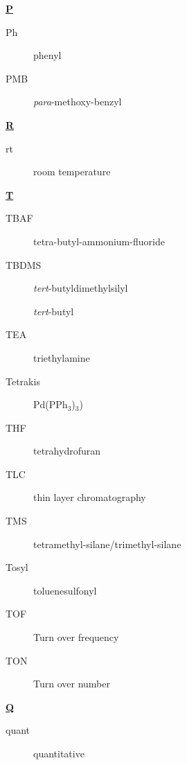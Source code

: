 \begin{multicols}{2}
{\begin{center}
\textbf{\underline{P}}
\end{center}
\begin{description}
\item[Ph]   phenyl 
\item[PMB]  \textit{para}-methoxy-benzyl
\end{description}

\begin{center}
\textbf{\underline{R}}
\end{center}
\begin{description}
\item[rt]   room temperature 
\end{description}

\begin{center}
\textbf{\underline{T}}
\end{center}
\begin{description}
\item[TBAF]	 tetra-butyl-ammonium-fluoride
\item[TBDMS]  \textit{tert}-butyldimethylsilyl
\item[\tBu]   \textit{tert}-butyl
\item[TEA]   triethylamine 
\item[Tetrakis]  Pd(PPh$_3$)$_3$)
\item[THF]   tetrahydrofuran 
\item[TLC]   thin layer chromatography 
\item[TMS]   tetramethyl-silane/trimethyl-silane
\item[Tosyl]   toluenesulfonyl 
\item[TOF]	Turn over frequency
\item[TON]  Turn over number
\end{description}}

\begin{center}
\textbf{\underline{Q}}
\end{center}
\begin{description}
\item[quant]  quantitative
\end{description}

\end{multicols}

\setcounter{secnumdepth}{2}

